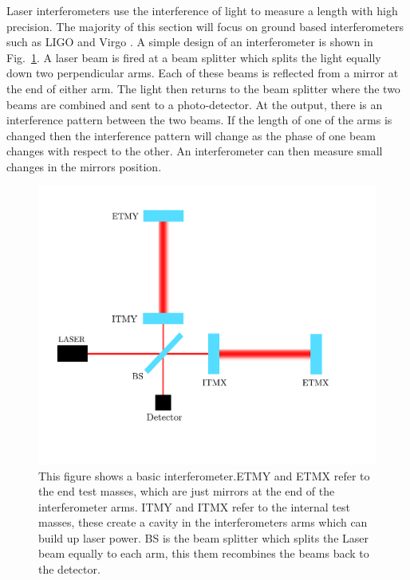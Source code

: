 Laser interferometers use the interference of light to measure a length with high precision.
The majority of this section will focus on ground based interferometers such as \ac{LIGO} and Virgo \citep{aasi2015AdvancedLIGO,acernese2015AdvancedVirgo}.
A simple design of an interferometer is shown in Fig.~\ref{detectors:interferometer}. 
A laser beam is fired at a beam splitter which splits the light equally down two perpendicular arms. 
Each of these beams is reflected from a mirror at the end of either arm.
The light then returns to the beam splitter where the two beams are combined and sent to a photo-detector.
At the output, there is an interference pattern between the two beams.
If the length of one of the arms is changed then the interference pattern will change as the phase of one beam changes with respect to the other.
An interferometer can then measure small changes in the mirrors position.
\begin{figure}[h]
    \centering
    \includegraphics[width=\textwidth]{C1_intro/interferometer.pdf}
    \caption{This figure shows a basic interferometer.ETMY and ETMX refer to the end test masses, which are just mirrors at the end of the interferometer arms. ITMY and ITMX refer to the internal test masses, these create a cavity in the interferometers arms which can build up laser power. BS is the beam splitter which splits the Laser beam equally to each arm, this them recombines the beams back to the detector.}
    \label{detectors:interferometer}
\end{figure}


